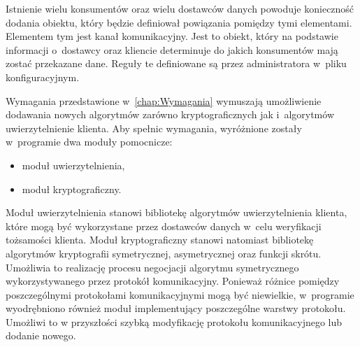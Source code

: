 Istnienie wielu konsumentów oraz wielu dostawców danych powoduje
konieczność dodania obiektu, który będzie definiował powiązania
pomiędzy tymi elementami. Elementem tym jest kanał komunikacyjny. Jest
to obiekt, który na podstawie informacji o~dostawcy oraz kliencie
determinuje do jakich konsumentów mają zostać przekazane dane. Reguły
te definiowane są przez administratora w~pliku konfiguracyjnym.

Wymagania przedstawione w~\ref{chap:Wymagania} wymuszają umożliwienie
dodawania nowych algorytmów zarówno kryptograficznych jak i~algorytmów
uwierzytelnienie klienta. Aby spełnic wymagania, wyróżnione zostały
w~programie dwa moduły pomocnicze:

\begin{itemize}
\item moduł uwierzytelnienia,
\item moduł kryptograficzny.
\end{itemize}

Moduł uwierzytelnienia stanowi bibliotekę algorytmów uwierzytelnienia
klienta, które mogą być wykorzystane przez dostawców danych w~celu
weryfikacji tożsamości klienta. Moduł kryptograficzny stanowi
natomiast bibliotekę algorytmów kryptografii symetrycznej,
asymetrycznej oraz funkcji skrótu. Umożliwia to realizację procesu
negocjacji algorytmu symetrycznego wykorzystywanego przez protokół
komunikacyjny. Ponieważ różnice pomiędzy poszczególnymi protokołami
komunikacyjnymi mogą być niewielkie, w~programie wyodrębniono również
moduł implementujący poszczególne warstwy protokołu. Umożliwi to w
przyszłości szybką modyfikację protokołu komunikacyjnego lub dodanie
nowego.
